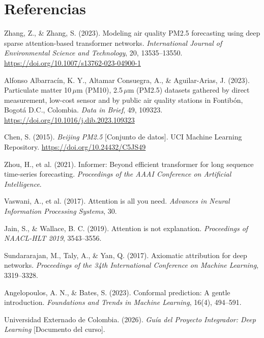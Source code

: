 \documentclass[11pt,letterpaper]{article}
\begin{document}
\section*{Referencias}
\small
\begin{enumerate}[label={[\arabic*]},leftmargin=2.2em]
\item Zhang, Z., \& Zhang, S. (2023). Modeling air quality PM2.5 forecasting using deep sparse attention-based transformer networks. \emph{International Journal of Environmental Science and Technology}, 20, 13535–13550. \url{https://doi.org/10.1007/s13762-023-04900-1}
\item Alfonso Albarracín, K. Y., Altamar Consuegra, A., \& Aguilar-Arias, J. (2023). Particulate matter 10\,$\mu$m (PM10), 2.5\,$\mu$m (PM2.5) datasets gathered by direct measurement, low-cost sensor and by public air quality stations in Fontibón, Bogotá D.C., Colombia. \emph{Data in Brief}, 49, 109323. \url{https://doi.org/10.1016/j.dib.2023.109323}
\item Chen, S. (2015). \emph{Beijing PM2.5} [Conjunto de datos]. UCI Machine Learning Repository. \url{https://doi.org/10.24432/C5JS49}
\item Zhou, H., et al. (2021). Informer: Beyond efficient transformer for long sequence time-series forecasting. \emph{Proceedings of the AAAI Conference on Artificial Intelligence}.
\item Vaswani, A., et al. (2017). Attention is all you need. \emph{Advances in Neural Information Processing Systems}, 30.
\item Jain, S., \& Wallace, B. C. (2019). Attention is not explanation. \emph{Proceedings of NAACL-HLT 2019}, 3543–3556.
\item Sundararajan, M., Taly, A., \& Yan, Q. (2017). Axiomatic attribution for deep networks. \emph{Proceedings of the 34th International Conference on Machine Learning}, 3319–3328.
\item Angelopoulos, A. N., \& Bates, S. (2023). Conformal prediction: A gentle introduction. \emph{Foundations and Trends in Machine Learning}, 16(4), 494–591.
\item Universidad Externado de Colombia. (2026). \emph{Guía del Proyecto Integrador: Deep Learning} [Documento del curso].
\end{enumerate}
\end{document}

